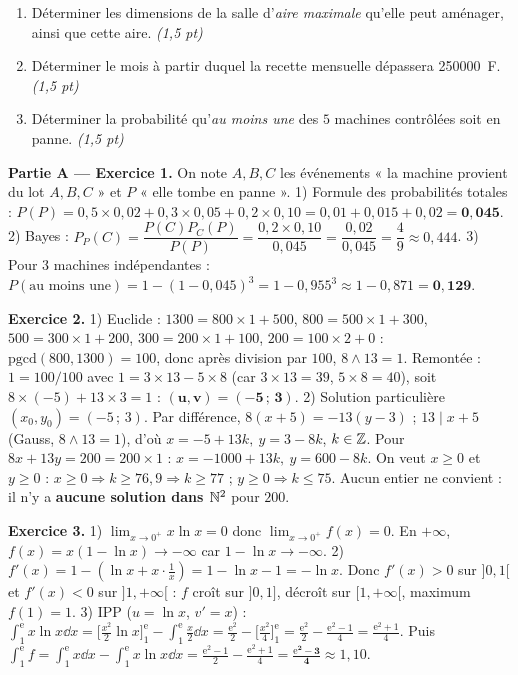 \begin{enumerate}[label=\textbf{Tâche \arabic*.},leftmargin=2.4em]
\item Déterminer les dimensions de la salle d'\emph{aire maximale} qu'elle peut aménager,
ainsi que cette aire. \hfill\textit{(1,5 pt)}
\item Déterminer le mois à partir duquel la recette mensuelle dépassera \SI{250000}{F}. \hfill\textit{(1,5 pt)}
\item Déterminer la probabilité qu'\emph{au moins une} des $5$ machines contrôlées soit en
panne. \hfill\textit{(1,5 pt)}
\end{enumerate}
\par{}


\noindent\textbf{Partie A — Exercice 1.}
On note $A,B,C$ les événements « la machine provient du lot $A,B,C$ » et $P$ « elle tombe en panne ».
1) Formule des probabilités totales :
$P(P)=0{,}5\times0{,}02+0{,}3\times0{,}05+0{,}2\times0{,}10=0{,}01+0{,}015+0{,}02=\mathbf{0{,}045}$.
2) Bayes : $P_P(C)=\dfrac{P(C)P_C(P)}{P(P)}=\dfrac{0{,}2\times0{,}10}{0{,}045}=\dfrac{0{,}02}{0{,}045}=\dfrac{4}{9}\approx0{,}444$.
3) Pour $3$ machines indépendantes : $P(\text{au moins une})=1-(1-0{,}045)^3=1-0{,}955^3\approx1-0{,}871=\mathbf{0{,}129}$.

\noindent\textbf{Exercice 2.}
1) Euclide : $1300=800\times1+500$, $800=500\times1+300$, $500=300\times1+200$,
$300=200\times1+100$, $200=100\times2+0$ : $\mathrm{pgcd}(800,1300)=100$, donc après division par
$100$, $8\wedge13=1$. Remontée : $1=100/100$ avec $1=3\times13-5\times8$ (car $3\times13=39$,
$5\times8=40$), soit $8\times(-5)+13\times3=1$ : $\mathbf{(u,v)=(-5\,;\,3)}$.
2) Solution particulière $(x_0,y_0)=(-5\,;\,3)$. Par différence, $8(x+5)=-13(y-3)$ ;
$13\mid x+5$ (Gauss, $8\wedge13=1$), d'où $x=-5+13k,\ y=3-8k$, $k\in\mathbb{Z}$.
Pour $8x+13y=200=200\times1$ : $x=-1000+13k,\ y=600-8k$. On veut $x\ge0$ et $y\ge0$ :
$x\ge0\Rightarrow k\ge76{,}9\Rightarrow k\ge77$ ; $y\ge0\Rightarrow k\le75$. Aucun entier
ne convient : il n'y a \textbf{aucune solution dans $\mathbb{N}^2$} pour $200$.

\noindent\textbf{Exercice 3.}
1) $\lim_{x\to0^+}x\ln x=0$ donc $\lim_{x\to0^+}f(x)=0$. En $+\infty$,
$f(x)=x(1-\ln x)\to-\infty$ car $1-\ln x\to-\infty$.
2) $f'(x)=1-(\ln x+x\cdot\frac1x)=1-\ln x-1=-\ln x$. Donc $f'(x)>0$ sur $]0,1[$ et
$f'(x)<0$ sur $]1,+\infty[$ : $f$ croît sur $]0,1]$, décroît sur $[1,+\infty[$, maximum $f(1)=1$.
3) IPP ($u=\ln x$, $v'=x$) : $\int_1^{\mathrm e}x\ln x\dd x=\big[\frac{x^2}{2}\ln x\big]_1^{\mathrm e}-\int_1^{\mathrm e}\frac{x}{2}\dd x
=\frac{\mathrm e^2}{2}-\big[\frac{x^2}{4}\big]_1^{\mathrm e}=\frac{\mathrm e^2}{2}-\frac{\mathrm e^2-1}{4}=\frac{\mathrm e^2+1}{4}$.
Puis $\int_1^{\mathrm e}f=\int_1^{\mathrm e}x\dd x-\int_1^{\mathrm e}x\ln x\dd x=\frac{\mathrm e^2-1}{2}-\frac{\mathrm e^2+1}{4}=\frac{\mathbf{\mathrm e^2-3}}{\mathbf 4}\approx1{,}10$.

